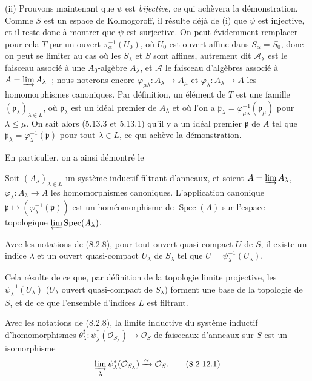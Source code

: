 \medskip
\noindent
(ii) Prouvons maintenant que $\psi$ est \emph{bijective}, ce qui achèvera la
démonstration. Comme $S$ est un espace de Kolmogoroff, il résulte déjà de (i)
que $\psi$ est injective, et il reste donc à montrer que $\psi$ est
surjective. On peut évidemment remplacer pour cela $T$ par un ouvert
$\pi_\alpha^{-1}(U_0)$, où $U_0$ est ouvert affine dans $S_\alpha=S_0$, donc
on peut se limiter au cas où les $S_\lambda$ et $S$ sont affines, autrement
dit $\mathscr A_\lambda$ est le faisceau associé à une $A_0$-algèbre
$A_\lambda$, et $\mathscr A$ le faisceau d'algèbres associé à
$A=\varinjlim A_\lambda$~; nous noterons encore
$\varphi_{\mu\lambda}:A_\lambda\to A_\mu$ et
$\varphi_\lambda:A_\lambda\to A$ les homomorphismes canoniques. Par
définition, un élément de $T$ est une famille
$(\mathfrak p_\lambda)_{\lambda\in L}$, où $\mathfrak p_\lambda$ est un
idéal premier de $A_\lambda$ et où l'on a
$\mathfrak p_\lambda=\varphi_{\mu\lambda}^{-1}(\mathfrak p_\mu)$ pour
$\lambda\leq\mu$. On sait alors (5.13.3 et 5.13.1) qu'il y a un idéal premier
$\mathfrak p$ de $A$ tel que
$\mathfrak p_\lambda=\varphi_\lambda^{-1}(\mathfrak p)$ pour tout
$\lambda\in L$, ce qui achève la démonstration.

En particulier, on a ainsi démontré le

\begin{corollary}[8.2.10]
\label{IV.8.2.10-fr}
Soit $(A_\lambda)_{\lambda\in L}$ un système inductif filtrant d'anneaux, et
soient $A=\varinjlim A_\lambda$, $\varphi_\lambda:A_\lambda\to A$ les
homomorphismes canoniques. L'application canonique
$\mathfrak p\mapsto(\varphi_\lambda^{-1}(\mathfrak p))$ est un
homéomorphisme de $\operatorname{Spec}(A)$ sur l'espace topologique
$\varprojlim\operatorname{Spec}(A_\lambda)$.
\end{corollary}

\begin{corollary}[8.2.11]
\label{IV.8.2.11-fr}
Avec les notations de (8.2.8), pour tout ouvert quasi-compact $U$ de $S$, il
existe un indice $\lambda$ et un ouvert quasi-compact $U_\lambda$ de
$S_\lambda$ tel que $U=\psi_\lambda^{-1}(U_\lambda)$.
\end{corollary}

Cela résulte de ce que, par définition de la topologie limite projective, les
$\psi_\lambda^{-1}(U_\lambda)$ ($U_\lambda$ ouvert quasi-compact de
$S_\lambda$) forment une base de la topologie de $S$, et de ce que l'ensemble
d'indices $L$ est filtrant.

\begin{corollary}[8.2.12]
\label{IV.8.2.12-fr}
Avec les notations de (8.2.8), la limite inductive du système inductif
d'homomorphismes
$\theta_\lambda^\sharp:\psi_\lambda^*(\mathcal O_{S_\lambda})\to
\mathcal O_S$ de faisceaux d'anneaux sur $S$ est un isomorphisme
\begin{equation}
\varinjlim_\lambda\psi_\lambda^*(\mathcal O_{S_\lambda})
\xrightarrow{\sim}\mathcal O_S.
\tag{8.2.12.1}\label{IV.8.2.12.1-fr}
\end{equation}
\end{corollary}


